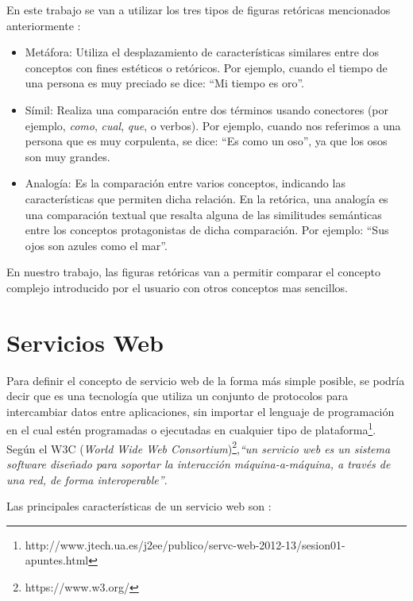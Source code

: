En este trabajo se van a utilizar los tres tipos de figuras retóricas mencionados anteriormente \citep{TFMPaloma}: 
\begin{itemize}
	\item Metáfora: Utiliza el desplazamiento de características similares entre dos conceptos con fines estéticos o retóricos. Por ejemplo, cuando el tiempo de una persona es muy preciado se dice: ``Mi tiempo es oro''.
	
	\item Símil: Realiza una comparación entre dos términos usando conectores (por ejemplo, \textit{como}, \textit{cual}, \textit{que}, o verbos).
	Por ejemplo, cuando nos referimos a una persona que es muy corpulenta, se dice: ``Es como un oso'', ya que los osos son muy grandes.
	
	\item Analogía: Es la comparación entre varios conceptos, indicando las características que permiten dicha relación. En la retórica, una analogía es una comparación textual que resalta alguna de las similitudes semánticas entre los conceptos protagonistas de dicha comparación. Por ejemplo: ``Sus ojos son azules como el mar''.
	
\end{itemize}

En nuestro trabajo, las figuras retóricas van a permitir comparar el concepto complejo introducido por el usuario con otros conceptos mas sencillos.

\section{Servicios Web}
\label{cap:sec:serviciosweb}

Para definir el concepto de servicio web de la forma más simple posible, se podría decir que es una tecnología que utiliza un conjunto de protocolos para intercambiar datos entre aplicaciones, sin importar el lenguaje de programación en el cual estén programadas o ejecutadas en cualquier tipo de plataforma\footnote{http://www.jtech.ua.es/j2ee/publico/servc-web-2012-13/sesion01-apuntes.html}. Según el W3C (\textit{World Wide Web Consortium})\footnote{https://www.w3.org/},\textit{``un servicio web es un sistema software diseñado para soportar la interacción máquina-a-máquina, a través de una red, de forma interoperable''}.

Las principales características de un servicio web son \citep{TorresJoaquin2017SC}:

